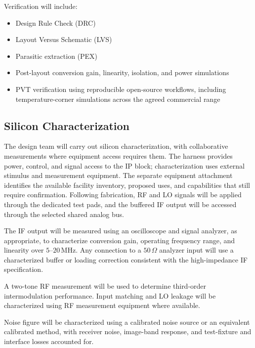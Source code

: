 \documentclass[11pt,letterpaper]{article}
\begin{document}
Verification will include:

\begin{itemize}
    \item Design Rule Check (DRC)

    \item Layout Versus Schematic (LVS)

    \item Parasitic extraction (PEX)

    \item Post-layout conversion gain, linearity, isolation, and power simulations

    \item PVT verification using reproducible open-source workflows, including temperature-corner simulations across the agreed commercial range
\end{itemize}


\subsection{Silicon Characterization}

The design team will carry out silicon characterization, with collaborative measurements where equipment access requires them.
The harness provides power, control, and signal access to the IP block; characterization uses external stimulus and measurement equipment.
The separate equipment attachment identifies the available facility inventory, proposed uses, and capabilities that still require confirmation.
Following fabrication, RF and LO signals will be applied through the dedicated test pads, and the buffered IF output will be accessed through the selected shared analog bus.

The IF output will be measured using an oscilloscope and signal analyzer, as appropriate, to characterize conversion gain, operating frequency range, and linearity over \(5\)--\(20\,\mathrm{MHz}\).
Any connection to a \(50\,\Omega\) analyzer input will use a characterized buffer or loading correction consistent with the high-impedance IF specification.

A two-tone RF measurement will be used to determine third-order intermodulation performance.
Input matching and LO leakage will be characterized using RF measurement equipment where available.

Noise figure will be characterized using a calibrated noise source or an equivalent calibrated method, with receiver noise, image-band response, and test-fixture and interface losses accounted for.
\end{document}
